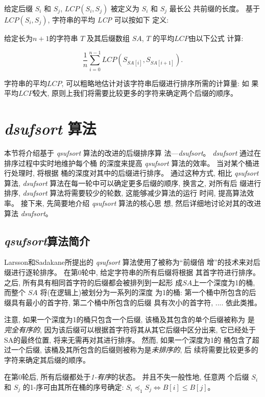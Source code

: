 给定后缀 $S_i$ 和 $S_j$, $LCP(S_i, S_j)$ 被定义为 $S_i$ 和 $S_j$ 最长公
共前缀的长度。 基于 $LCP(S_i, S_j)$, 字符串的平均 \emph{LCP} 可以按如下
定义:

给定长为$n+1$的字符串 $T$ 及其后缀数组 $SA$, $T$ 的平均$LCP$由以下公式
计算:

\begin{equation}
\frac{1}{n}\sum_{i=0}^{n-1}LCP(S_{SA[i]},S_{SA[i+1]}).
\end{equation}

字符串的平均$LCP$, 可以粗略地估计对该字符串后缀进行排序所需的计算量: 如
果平均$LCP$较大, 原则上我们将需要比较更多的字符来确定两个后缀的顺序。

\section{ \emph{dsufsort} 算法}

本节将介绍基于 \emph{qsufsort} 算法的改进的后缀排序算
法---\emph{dsufsort}。 \emph{dsufsort} 通过在排序过程中实时地维护每个桶
的深度来提高 \emph{qsufsort} 算法的效率。 当对某个桶进行处理时, 将根据
桶的深度对其中的后缀进行排序。 通过这种方式, 相比 \emph{qsufsort} 算法,
\emph{dsufsort} 算法在每一轮中可以确定更多后缀的顺序, 换言之, 对所有后
缀进行排序, \emph{dsufsort} 算法将需要较少的轮数, 这能够减少算法的运行
时间, 提高算法效率。 接下来, 先简要地介绍 \emph{qsufsort} 算法的核心思
想, 然后详细地讨论对其的改进算法 \emph{dsufsort}。

\subsection{ \emph{qsufsort}算法简介}
\label{sec:qsufsort}

Larsson和Sadakane所提出的 \emph{qsufsort} 算法使用了被称为“前缀倍
增”的技术来对后缀进行逐轮排序。 在第0轮中, 给定字符串的所有后缀将根据
其首字符进行排序。 之后, 所有具有相同首字符的后缀都会被排列到一起形
成$SA$上一个深度为1的桶, 而整个 $SA$ 将(在逻辑上)被划分为一系列的深度
为1的桶: 第一个桶中所包含的后缀具有最小的首字符, 第二个桶中所包含的后缀
具有次小的首字符, .... 依此类推。

注意, 如果一个深度为1的桶只包含一个后缀, 该桶及其包含的单个后缀被称为
是\emph{完全有序的}, 因为该后缀可以根据首字符将其从其它后缀中区分出来,
它已经处于SA的最终位置, 将来无需再对其进行排序。 然而, 如果一个深度为1的
桶包含了超过一个后缀, 该桶及其所包含的后缀则被称为是\emph{未排序的}, 后
续将需要比较更多的字符来确定其后缀的顺序。

在第0轮后, 所有后缀都处于\emph{1-有序}的状态。 并且不失一般性地, 任意两
个后缀 $S_i$ 和 $S_j$ 的1-序可由其所在桶的序号确定:
$S_i \preceq_1 S_j \iff B[i] \leq B[j]$。


